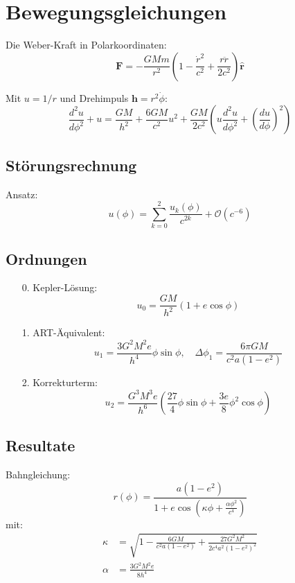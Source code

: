 \newpage
\section{Bewegungsgleichungen}
Die Weber-Kraft in Polarkoordinaten:
\begin{equation}
\mathbf{F} = -\frac{GMm}{r^2}\left(1 - \frac{\dot{r}^2}{c^2} + \frac{r\ddot{r}}{2c^2}\right)\mathbf{\hat{r}}
\end{equation}

Mit $u=1/r$ und Drehimpuls $\mathbf{h}=r^2\dot{\phi}$:
\begin{equation}
\frac{d^2u}{d\phi^2} + u = \frac{GM}{h^2} + \frac{6GM}{c^2}u^2 + \frac{GM}{2c^2}\left(u\frac{d^2u}{d\phi^2} + \left(\frac{du}{d\phi}\right)^2\right)
\end{equation}

\subsection{Störungsrechnung}
Ansatz:
\begin{equation}
u(\phi) = \sum_{k=0}^2 \frac{u_k(\phi)}{c^{2k}} + \mathcal{O}(c^{-6})
\end{equation}

\subsection{Ordnungen}
\begin{itemize}
\item[0.] Kepler-Lösung:
\begin{equation}
u_0 = \frac{GM}{h^2}(1 + e\cos\phi)
\end{equation}

\item[1.] ART-Äquivalent:
\begin{equation}
u_1 = \frac{3G^2M^2e}{h^4}\phi\sin\phi,\quad \Delta\phi_1 = \frac{6\pi GM}{c^2a(1-e^2)}
\end{equation}

\item[2.] Korrekturterm:
\begin{equation}
u_2 = \frac{G^3M^3e}{h^6}\left(\frac{27}{4}\phi\sin\phi + \frac{3e}{8}\phi^2\cos\phi\right)
\end{equation}
\end{itemize}

\subsection{Resultate}
Bahngleichung:
\begin{equation}
\boxed
{
    r(\phi) = \frac{a(1-e^2)}{1 + e\cos\left(\kappa\phi + \frac{\alpha\phi^2}{c^4}\right)}
}
\end{equation}
mit:
\begin{align}
\kappa &= \sqrt{1 - \frac{6GM}{c^2a(1-e^2)} + \frac{27G^2M^2}{2c^4a^2(1-e^2)^2}}\\
\alpha &= \frac{3G^2M^2e}{8h^4}
\end{align}

